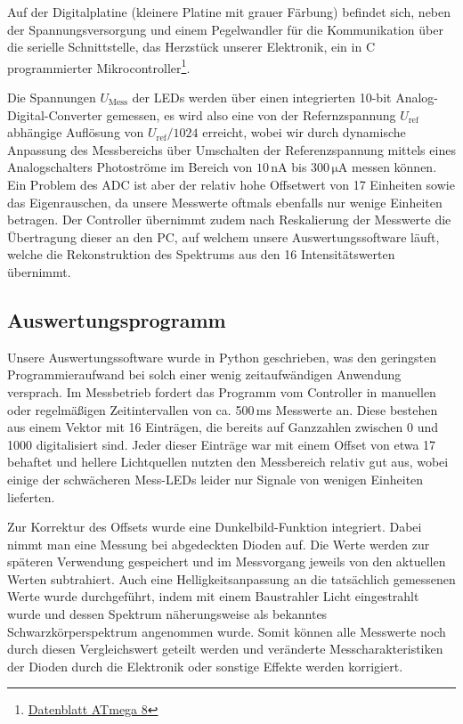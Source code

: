 \documentclass[11pt]{scrartcl}
\newcommand{\unit}[1]{\ensuremath{\,\mathrm{#1}}} %
\begin{document}
Auf der Digitalplatine (kleinere Platine mit grauer Färbung) befindet sich, neben der Spannungsversorgung und einem Pegelwandler für die Kommunikation über die serielle Schnittstelle,  das Herzstück unserer Elektronik, ein in C programmierter Mikrocontroller\footnote{\href{http://www.atmel.com/dyn/resources/prod_documents/doc2486.pdf}{Datenblatt ATmega 8}}.

Die Spannungen $U_{\text{Mess}}$ der LEDs werden über einen integrierten 10-bit Analog-Digital-Converter gemessen, es wird also eine von der Refernzspannung $U_{\text{ref}}$ abhängige Auflösung von $U_{\text{ref}}/1024$ erreicht, wobei wir durch dynamische Anpassung des Messbereichs über Umschalten der Referenzspannung mittels eines Analogschalters Photoströme im Bereich von $10 \unit{nA}$ bis $300 \unit{\mu A}$ messen können. Ein Problem des ADC ist aber der relativ hohe Offsetwert von 17 Einheiten sowie das Eigenrauschen, da unsere Messwerte oftmals ebenfalls nur wenige Einheiten betragen. Der Controller übernimmt zudem nach Reskalierung der Messwerte die Übertragung dieser an den PC, auf welchem unsere Auswertungssoftware läuft, welche die Rekonstruktion des Spektrums aus den 16 Intensitätswerten übernimmt.

\subsection{Auswertungsprogramm} %
Unsere Auswertungssoftware wurde in Python geschrieben, was den geringsten Programmieraufwand bei solch einer wenig zeitaufwändigen Anwendung versprach.
Im Messbetrieb fordert das Programm vom Controller in manuellen oder regelmäßigen Zeitintervallen von ca. 500\,ms Messwerte an.
Diese bestehen aus einem Vektor mit 16 Einträgen, die bereits auf Ganzzahlen zwischen 0 und 1000 digitalisiert sind.
Jeder dieser Einträge war mit einem Offset von etwa 17 behaftet und hellere Lichtquellen nutzten den Messbereich relativ gut aus, wobei einige der schwächeren Mess-LEDs leider nur Signale von wenigen Einheiten lieferten.

Zur Korrektur des Offsets wurde eine Dunkelbild-Funktion integriert.
Dabei nimmt man eine Messung bei abgedeckten Dioden auf.
Die Werte werden zur späteren Verwendung gespeichert und im Messvorgang jeweils von den aktuellen Werten subtrahiert.
Auch eine Helligkeitsanpassung an die tatsächlich gemessenen Werte wurde durchgeführt, indem mit einem Baustrahler Licht eingestrahlt wurde und dessen Spektrum näherungsweise als bekanntes Schwarzkörperspektrum angenommen wurde.
Somit können alle Messwerte noch durch diesen Vergleichswert geteilt werden und veränderte Mess\-charakteristiken der Dioden durch die Elektronik oder sonstige Effekte werden korrigiert.
\end{document}
